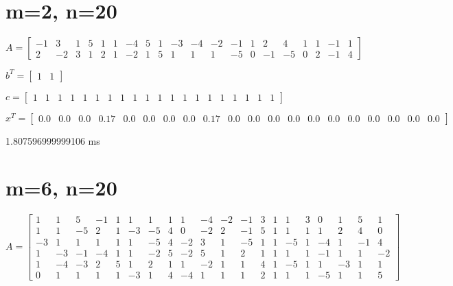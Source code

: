 \documentclass[8pt]{article}
\begin{document}
\section{ m=2, n=20 }



$ A =
\begin{bmatrix}
 -1  &  3  &  1  &  5  &  1  &  1  & -4  &  5  &  1  & -3  & -4  & -2  & -1  &  1  &  2  &  4  &  1  &  1  & -1  &  1 \\
  2  & -2  &  3  &  1  &  2  &  1  & -2  &  1  &  5  &  1  &  1  &  1  & -5  &  0  & -1  & -5  &  0  &  2  & -1  &  4 
\end{bmatrix}
$


$ b^T =
\begin{bmatrix}
  1  &  1 
\end{bmatrix}
$


$ c =
\begin{bmatrix}
  1  &  1  &  1  &  1  &  1  &  1  &  1  &  1  &  1  &  1  &  1  &  1  &  1  &  1  &  1  &  1  &  1  &  1  &  1  &  1 
\end{bmatrix}
$


$ x^T =
\begin{bmatrix}
  0.0 &  0.0 &  0.0 &  0.17 &  0.0 &  0.0 &  0.0 &  0.0 &  0.17 &  0.0 &  0.0 &  0.0 &  0.0 &  0.0 &  0.0 &  0.0 &  0.0 &  0.0 &  0.0 &  0.0
\end{bmatrix}
$


1.807596999999106  ms


\section{ m=6, n=20 }



$ A =
\begin{bmatrix}
  1  &  1  &  5  & -1  &  1  &  1  &  1  &  1  &  1  & -4  & -2  & -1  &  3  &  1  &  1  &  3  &  0  &  1  &  5  &  1 \\
  1  &  1  & -5  &  2  &  1  & -3  & -5  &  4  &  0  & -2  &  2  & -1  &  5  &  1  &  1  &  1  &  1  &  2  &  4  &  0 \\
 -3  &  1  &  1  &  1  &  1  &  1  & -5  &  4  & -2  &  3  &  1  & -5  &  1  &  1  & -5  &  1  & -4  &  1  & -1  &  4 \\
  1  & -3  & -1  & -4  &  1  &  1  & -2  &  5  & -2  &  5  &  1  &  2  &  1  &  1  &  1  &  1  & -1  &  1  &  1  & -2 \\
  1  & -4  & -3  &  2  &  5  &  1  &  2  &  1  &  1  & -2  &  1  &  1  &  4  &  1  & -5  &  1  &  1  & -3  &  1  &  1 \\
  0  &  1  &  1  &  1  &  1  & -3  &  1  &  4  & -4  &  1  &  1  &  1  &  2  &  1  &  1  &  1  & -5  &  1  &  1  &  5 
\end{bmatrix}
$
\end{document}
